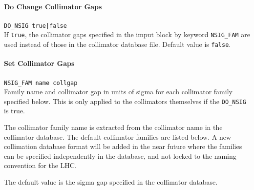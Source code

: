 \paragraph{Do Change Collimator Gaps} \texttt{DO\_NSIG true|false}\\

If \texttt{true}, the collimator gaps specified in the imput block by keyword \texttt{NSIG\_FAM} are used instead of those in the collimator database file.
Default value is \texttt{false}.

\paragraph{Set Collimator Gaps} \texttt{NSIG\_FAM name collgap}\\

Family name and collimator gap in units of sigma for each collimator family specified below.
This is only applied to the collimators themselves if the \texttt{DO\_NSIG} is true.

The collimator family name is extracted from the collimator name in the collimator database.
The default collimator families are listed below.
A new collimation database format will be added in the near future where the families can be specified independently in the database, and not locked to the naming convention for the LHC.

The default value is the sigma gap specified in the collimator database.


